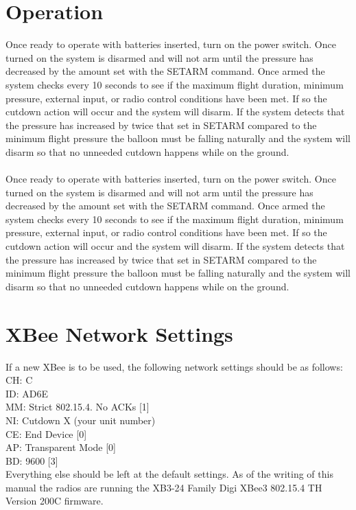 \documentclass[letter,12pt,oneside,pdflatex,italian,final,twocolumn]{article}
\begin{document}
\section{Operation}
Once ready to operate with batteries inserted, turn on the power switch. Once turned on the system is disarmed and will not arm until the pressure has decreased by the amount set with the SETARM command. Once armed the system checks every 10 seconds to see if the maximum flight duration, minimum pressure, external input, or radio control conditions have been met. If so the cutdown action will occur and the system will disarm. If the system detects that the pressure has increased by twice that set in SETARM compared to the minimum flight pressure the balloon must be falling naturally and the system will disarm so that no unneeded cutdown happens while on the ground.\\
\\
Once ready to operate with batteries inserted, turn on the power switch. Once turned on the system is disarmed and will not arm until the pressure has decreased by the amount set with the SETARM command. Once armed the system checks every 10 seconds to see if the maximum flight duration, minimum pressure, external input, or radio control conditions have been met. If so the cutdown action will occur and the system will disarm. If the system detects that the pressure has increased by twice that set in SETARM compared to the minimum flight pressure the balloon must be falling naturally and the system will disarm so that no unneeded cutdown happens while on the ground.




\section{XBee Network Settings}
If a new XBee is to be used, the following network settings should be as follows:\\
CH: C\\
ID: AD6E\\
MM: Strict 802.15.4. No ACKs [1]\\
NI: Cutdown X (your unit number)\\
CE: End Device [0]\\
AP: Transparent Mode [0]\\
BD: 9600 [3]\\
Everything else should be left at the default settings. As of the writing of this manual the radios are running the XB3-24 Family Digi XBee3 802.15.4 TH Version 200C firmware.
\end{document}
